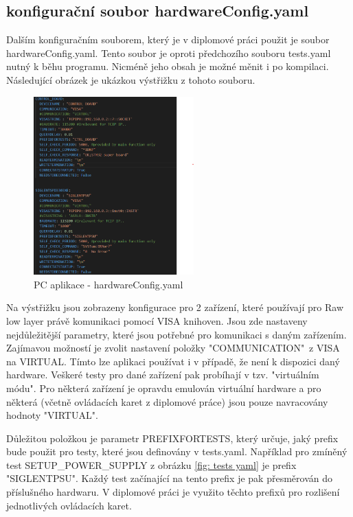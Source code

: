 \subsection{konfigurační soubor hardwareConfig.yaml}
Dalším konfiguračním souborem, který je v diplomové práci použit je soubor hardwareConfig.yaml. Tento soubor je oproti
předchozího souboru tests.yaml nutný k běhu programu. Nicméně jeho obsah je možné měnit i po kompilaci.
Následující obrázek je ukázkou výstřižku z tohoto souboru.
\begin{figure}[ht!]
    \centering
    \includegraphics[width = 0.55\textwidth]{obrazky/hardwareConfig.png}
    \caption{PC aplikace - hardwareConfig.yaml}
    \label{fig: hardwareConfig yaml}
\end{figure}
\clearpage

Na výstřižku jsou zobrazeny konfigurace pro 2 zařízení, které používají pro Raw low layer právě komunikaci pomocí VISA knihoven.
Jsou zde nastaveny nejdůležitější parametry, které jsou potřebné pro komunikaci s daným zařízením. Zajímavou možností je zvolit
nastavení položky "COMMUNICATION"\ z VISA na VIRTUAL. Tímto lze aplikaci používat i v případě, že není k dispozici daný hardware.
Veškeré testy pro dané zařízení pak probíhají v tzv. "virtuálním módu". Pro některá zařízení je opravdu emulován virtuální hardware
a pro některá (včetně ovládacích karet z diplomové práce) jsou pouze navracovány hodnoty "VIRTUAL".\par

Důležitou položkou je parametr PREFIXFORTESTS, který určuje, jaký prefix bude použit pro testy, které jsou definovány v tests.yaml.
Například pro zmíněný test\linebreak
SETUP\_POWER\_SUPPLY z obrázku \ref{fig: tests yaml} je prefix "SIGLENTPSU". Každý test začínající na tento
prefix je pak přesměrován do příslušného hardwaru. V diplomové práci je využito těchto prefixů pro rozlišení jednotlivých ovládacích karet.

